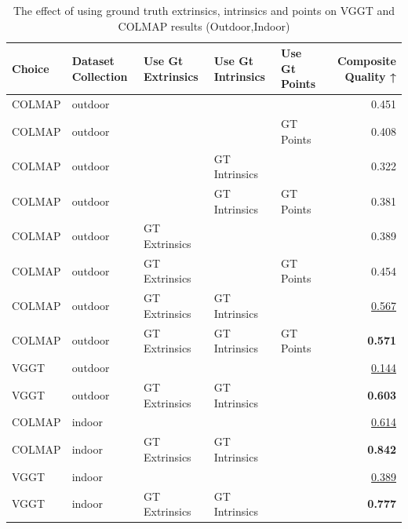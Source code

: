 \begin{table}[H]
\caption{The effect of using ground truth extrinsics, intrinsics and points on VGGT and COLMAP results (Outdoor,Indoor)}
\label{tab:06_gt_cams_outdoor,indoor}
\small
\begin{tabular}{lllllr}
\toprule
Choice & Dataset Collection & Use Gt Extrinsics & Use Gt Intrinsics & Use Gt Points & Composite Quality ↑ \\
\midrule
COLMAP & outdoor &  &  &  & 0.451 \\
COLMAP & outdoor &  &  & GT Points & 0.408 \\
COLMAP & outdoor &  & GT Intrinsics &  & 0.322 \\
COLMAP & outdoor &  & GT Intrinsics & GT Points & 0.381 \\
COLMAP & outdoor & GT Extrinsics &  &  & 0.389 \\
COLMAP & outdoor & GT Extrinsics &  & GT Points & 0.454 \\
COLMAP & outdoor & GT Extrinsics & GT Intrinsics &  & \underline{0.567} \\
COLMAP & outdoor & GT Extrinsics & GT Intrinsics & GT Points & \textbf{0.571} \\
\midrule
VGGT & outdoor &  &  &  & \underline{0.144} \\
VGGT & outdoor & GT Extrinsics & GT Intrinsics &  & \textbf{0.603} \\
\midrule
COLMAP & indoor &  &  &  & \underline{0.614} \\
COLMAP & indoor & GT Extrinsics & GT Intrinsics &  & \textbf{0.842} \\
\midrule
VGGT & indoor &  &  &  & \underline{0.389} \\
VGGT & indoor & GT Extrinsics & GT Intrinsics &  & \textbf{0.777} \\
\bottomrule
\end{tabular}
\end{table}